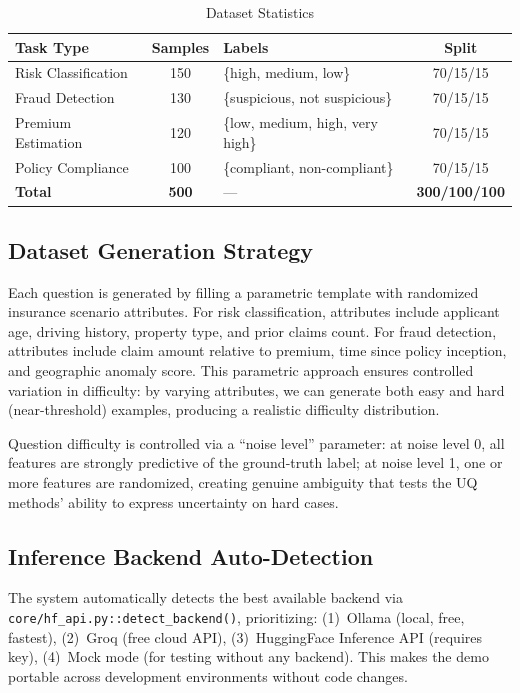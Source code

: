 \documentclass[conference]{IEEEtran}
\begin{document}
\begin{table}[htbp]
\centering
\caption{Dataset Statistics}
\label{tab:dataset}
\renewcommand{\arraystretch}{1.1}
\begin{tabularx}{\columnwidth}{l c X c}
\toprule
\textbf{Task Type} & \textbf{Samples} & \textbf{Labels} & \textbf{Split} \\
\midrule
Risk Classification & 150 & \{high, medium, low\} & 70/15/15 \\
Fraud Detection & 130 & \{suspicious, not suspicious\} & 70/15/15 \\
Premium Estimation & 120 & \{low, medium, high, very high\} & 70/15/15 \\
Policy Compliance & 100 & \{compliant, non-compliant\} & 70/15/15 \\
\midrule
\textbf{Total} & \textbf{500} & --- & \textbf{300/100/100} \\
\bottomrule
\end{tabularx}
\end{table}

\subsection{Dataset Generation Strategy}

Each question is generated by filling a parametric template with
randomized insurance scenario attributes. For risk classification,
attributes include applicant age, driving history, property type,
and prior claims count. For fraud detection, attributes include
claim amount relative to premium, time since policy inception, and
geographic anomaly score. This parametric approach ensures controlled
variation in difficulty: by varying attributes, we can generate both
easy and hard (near-threshold)
examples, producing a realistic difficulty distribution.

Question difficulty is controlled via a ``noise level'' parameter:
at noise level 0, all features are strongly predictive of the
ground-truth label; at noise level 1, one or more features are
randomized, creating genuine ambiguity that tests the UQ methods'
ability to express uncertainty on hard cases.

\subsection{Inference Backend Auto-Detection}

The system automatically detects the best available backend via
\texttt{core/hf\_api.py::detect\_backend()}, prioritizing:
(1)~Ollama (local, free, fastest), (2)~Groq (free cloud API),
(3)~HuggingFace Inference API (requires key), (4)~Mock mode (for
testing without any backend). This makes the demo portable across
development environments without code changes.
\end{document}
